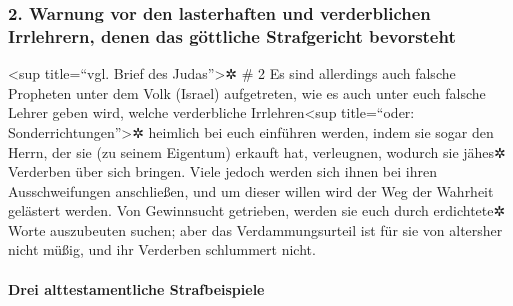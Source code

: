\hypertarget{warnung-vor-den-lasterhaften-und-verderblichen-irrlehrern-denen-das-guxf6ttliche-strafgericht-bevorsteht}{%
\subsubsection{2. Warnung vor den lasterhaften und verderblichen
Irrlehrern, denen das göttliche Strafgericht
bevorsteht}\label{warnung-vor-den-lasterhaften-und-verderblichen-irrlehrern-denen-das-guxf6ttliche-strafgericht-bevorsteht}}

\textless sup title=``vgl. Brief des Judas''\textgreater✲ \# 2
 Es sind allerdings auch falsche Propheten unter dem Volk
(Israel) aufgetreten, wie es auch unter euch falsche Lehrer geben wird,
welche verderbliche Irrlehren\textless sup title=``oder:
Sonderrichtungen''\textgreater✲ heimlich bei euch einführen werden,
indem sie sogar den Herrn, der sie (zu seinem Eigentum) erkauft hat,
verleugnen, wodurch sie jähes✲ Verderben über sich bringen.
 Viele jedoch werden sich ihnen bei ihren Ausschweifungen
anschließen, und um dieser willen wird der Weg der Wahrheit gelästert
werden.  Von Gewinnsucht getrieben, werden sie euch durch
erdichtete✲ Worte auszubeuten suchen; aber das Verdammungsurteil ist für
sie von altersher nicht müßig, und ihr Verderben schlummert nicht.

\hypertarget{drei-alttestamentliche-strafbeispiele}{%
\paragraph{Drei alttestamentliche
Strafbeispiele}\label{drei-alttestamentliche-strafbeispiele}}

